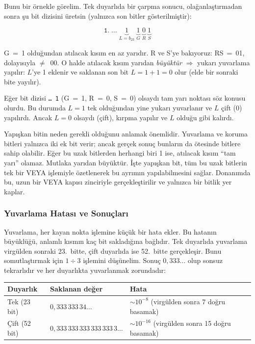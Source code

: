 Bunu bir örnekle görelim. Tek duyarlıda bir çarpma sonucu, olağanlaştırmadan sonra şu bit dizisini üretsin (yalnızca son bitler gösterilmiştir):

\[
\texttt{1.}\;\ldots\;\underbrace{1}_{L=b_{23}} \;\underbrace{1}_{G} \;\underbrace{0}_{R} \;\underbrace{1}_{S}
\]

G~=~1 olduğundan atılacak kısım en az yarıdır. R ve S'ye bakıyoruz: RS~=~01, dolayısıyla $\neq$~00. O halde atılacak kısım yarıdan \emph{büyüktür} $\Rightarrow$ yukarı yuvarlama yapılır: $L$'ye 1 eklenir ve saklanan son bit $L = 1 + 1 = 0$ olur (elde bir sonraki bite yayılır).

Eğer bit dizisi \texttt{\ldots\,1} (G~=~1, R~=~0, S~=~0) olsaydı tam yarı noktası söz konusu olurdu. Bu durumda $L = 1$ tek olduğundan yine yukarı yuvarlanır ve $L$ çift (0) yapılırdı. Ancak $L = 0$ olsaydı (çift), kırpma yapılır ve $L$ olduğu gibi kalırdı.

Yapışkan bitin neden gerekli olduğunu anlamak önemlidir. Yuvarlama ve koruma bitleri yalnızca iki ek bit verir; ancak gerçek sonuç bunların da ötesinde bitlere sahip olabilir. Eğer bu uzak bitlerden herhangi biri 1 ise, atılacak kısım ``tam yarı'' olamaz. Mutlaka yarıdan büyüktür. İşte yapışkan bit, tüm bu uzak bitlerin tek bir VEYA işlemiyle özetlenerek bu ayrımın yapılabilmesini sağlar. Donanımda bu, uzun bir VEYA kapısı zinciriyle gerçekleştirilir ve yalnızca bir bitlik yer kaplar.

\subsubsection{Yuvarlama Hatası ve Sonuçları}

Yuvarlama, her kayan nokta işlemine küçük bir hata ekler. Bu hatanın büyüklüğü, anlamlı kısmın kaç bit sakladığına bağlıdır. Tek duyarlıda yuvarlama virgülden sonraki 23.\ bitte, çift duyarlıda ise 52.\ bitte gerçekleşir. Bunu somutlaştırmak için $1 \div 3$ işlemini düşünelim. Sonuç $0{,}333\ldots$ olup sonsuz tekrarlıdır ve her duyarlıkta yuvarlanmak zorundadır:

\begin{center}
\small
\begin{tabular}{l l l}
\toprule
\textbf{Duyarlık} & \textbf{Saklanan değer} & \textbf{Hata} \\
\midrule
Tek (23 bit) & $0{,}333\,333\,34\ldots$ & $\sim 10^{-8}$ (virgülden sonra 7 doğru basamak) \\
Çift (52 bit) & $0{,}333\,333\,333\,333\,333\,3\ldots$ & $\sim 10^{-16}$ (virgülden sonra 15 doğru basamak) \\
\bottomrule
\end{tabular}
\end{center}

